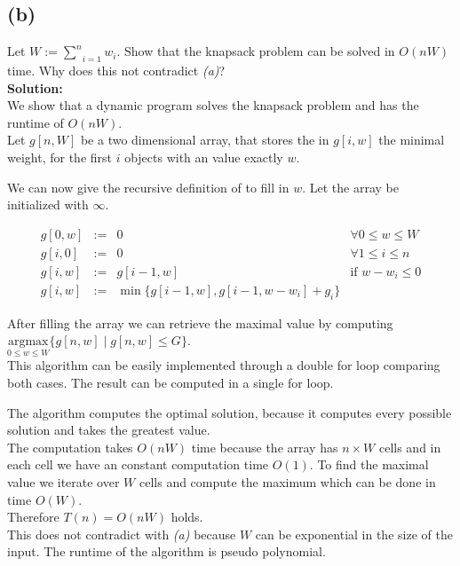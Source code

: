 \documentclass[11pt,a4paper,ngerman]{article}
\begin{document}
\subsection*{(b)}

Let $W := \underset{i=1}{\overset{n}{\sum}} w_i$. Show that the knapsack problem can be solved in $O(nW)$ time. Why does this not
contradict \emph{(a)}?\\

\textbf{Solution:}\\

We show that a dynamic program solves the knapsack problem and has the runtime of $O(nW)$.\\
Let $g[n,W]$ be a two dimensional array, that stores the in $g[i,w]$ the minimal weight, for the first $i$ objects
with an value exactly $w$.

We can now give the recursive definition of to fill in $w$. Let the array be initialized with $\infty$.

$$\begin{array}{lclr}
    g[0,w]  &:=& 0          & \forall 0 \leq w \leq W\\
    g[i,0]  &:=& 0          & \forall 1 \leq i \leq n\\
    g[i,w]  &:=& g[i-1,w]   & \text{if } w - w_i \leq 0\\
    g[i,w]  &:=& \min \{ g[i-1,w] , g[i-1 , w - w_i] + g_i\}
\end{array}$$

After filling the array we can retrieve the maximal value by computing\\
$\underset{0 \leq w \leq W}{\text{argmax}} \{ g[n,w] \; | \; g[n,w] \leq G \}$.\\

This algorithm can be easily implemented through a double for loop comparing
both cases. The result can be computed in a single for loop.

The algorithm computes the optimal solution, because it computes every possible solution and takes the greatest value.\\
The computation takes $O(nW)$ time because the array has $n \times W$ cells and in each cell we have an constant
computation time $O(1)$.
To find the maximal value we iterate over $W$ cells and compute the maximum which can be done in time $O(W)$.\\
Therefore $T(n) = O(nW)$ holds.\\

This does not contradict with \emph{(a)} because $W$ can be exponential in the size of the input. The runtime of the algorithm
is pseudo polynomial.
\end{document}
